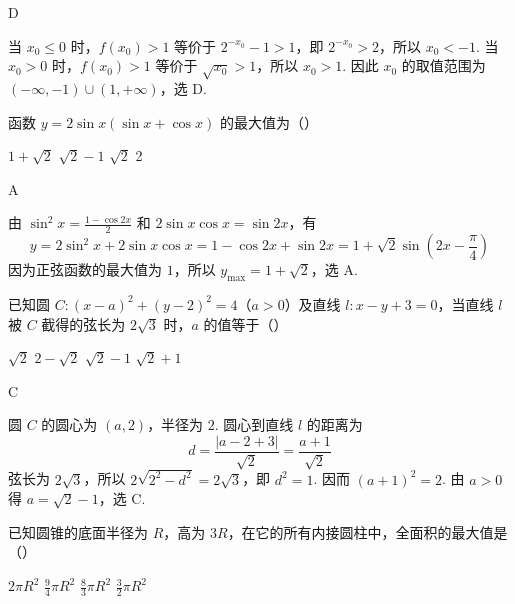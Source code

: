 \begin{answer}
D
\end{answer}

\begin{solution}
当 \(x_0\leqslant0\) 时，\(f(x_0)>1\) 等价于 \(2^{-x_0}-1>1\)，即 \(2^{-x_0}>2\)，所以 \(x_0<-1\). 当 \(x_0>0\) 时，\(f(x_0)>1\) 等价于 \(\sqrt{x_0}>1\)，所以 \(x_0>1\). 因此 \(x_0\) 的取值范围为 \((-\infty,-1)\cup(1,+\infty)\)，选 D.
\end{solution}

\begin{problem}
函数 \( y = 2\sin x (\sin x + \cos x) \) 的最大值为（\quad）

\choices
    {\(1 + \sqrt{2}\)}
    {\(\sqrt{2} - 1\)}
    {\(\sqrt{2}\)}
    {2}
\end{problem}

\begin{answer}
A
\end{answer}

\begin{solution}
由 \(\sin^2x=\frac{1-\cos2x}{2}\) 和 \(2\sin x\cos x=\sin2x\)，有
\[
y=2\sin^2x+2\sin x\cos x=1-\cos2x+\sin2x=1+\sqrt2\sin\left(2x-\frac\pi4\right)
\]
因为正弦函数的最大值为 \(1\)，所以 \(y_{\max}=1+\sqrt2\)，选 A.
\end{solution}

\begin{problem}
已知圆 \(C: (x - a)^2 + (y - 2)^2 = 4\)（\(a > 0\)）及直线 \(l: x - y + 3 = 0\)，当直线 \(l\) 被 \(C\) 截得的弦长为 \(2\sqrt{3}\) 时，\(a\) 的值等于（\quad）

\choices
    {\(\sqrt{2}\)}
    {\(2 - \sqrt{2}\)}
    {\(\sqrt{2} - 1\)}
    {\(\sqrt{2} + 1\)}
\end{problem}

\begin{answer}
C
\end{answer}

\begin{solution}
圆 \(C\) 的圆心为 \((a,2)\)，半径为 \(2\). 圆心到直线 \(l\) 的距离为
\[
d=\frac{|a-2+3|}{\sqrt2}=\frac{a+1}{\sqrt2}
\]
弦长为 \(2\sqrt3\)，所以 \(2\sqrt{2^2-d^2}=2\sqrt3\)，即 \(d^2=1\). 因而 \((a+1)^2=2\). 由 \(a>0\) 得 \(a=\sqrt2-1\)，选 C.
\end{solution}

\begin{problem}
已知圆锥的底面半径为 \(R\)，高为 \(3R\)，在它的所有内接圆柱中，全面积的最大值是（\quad）

\choices
    {\(2\pi R^2\)}
    {\(\frac{9}{4}\pi R^2\)}
    {\(\frac{8}{3}\pi R^2\)}
    {\(\frac{3}{2}\pi R^2\)}
\end{problem}

